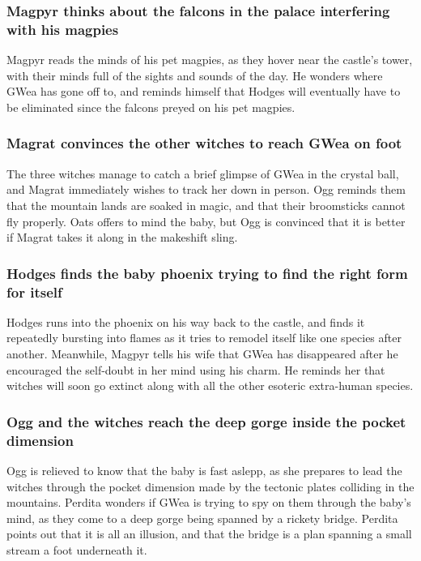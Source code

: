 \subsubsection{\Gls{Magpyr} thinks about the falcons in the palace interfering with his magpies}
\Gls{Magpyr} reads the minds of his pet magpies, as they hover near the castle's tower, with
their minds full of the sights and sounds of the day. He wonders where \Gls{GWea} has gone off to,
and reminds himself that \Gls{Hodges} will eventually have to be eliminated since the falcons preyed
on his pet magpies.

\subsubsection{\Gls{Magrat} convinces the other witches to reach \Gls{GWea} on foot}
The three witches manage to catch a brief glimpse of \Gls{GWea} in the crystal ball, and
\Gls{Magrat} immediately wishes to track her down in person. \Gls{Ogg} reminds them that the
mountain lands are soaked in magic, and that their broomsticks cannot fly properly. \Gls{Oats}
offers to mind the baby, but \Gls{Ogg} is convinced that it is better if \Gls{Magrat} takes it along
in the makeshift sling.

\subsubsection{\Gls{Hodges} finds the baby phoenix trying to find the right form for itself}
\Gls{Hodges} runs into the phoenix on his way back to the castle, and finds it repeatedly bursting
into flames as it tries to remodel itself like one species after another. Meanwhile, \Gls{Magpyr}
tells his wife that \Gls{GWea} has disappeared after he encouraged the self-doubt in her mind using
his charm. He reminds her that witches will soon go extinct along with all the other esoteric
extra-human species.

\subsubsection{\Gls{Ogg} and the witches reach the deep gorge inside the pocket dimension}
\Gls{Ogg} is relieved to know that the baby is fast aslepp, as she prepares to lead the witches
through the pocket dimension made by the tectonic plates colliding in the mountains. \Gls{Perdita}
wonders if \Gls{GWea} is trying to spy on them through the baby's mind, as they come to a deep
gorge being spanned by a rickety bridge. \Gls{Perdita} points out that it is all an illusion, and
that the bridge is a plan spanning a small stream a foot underneath it.

